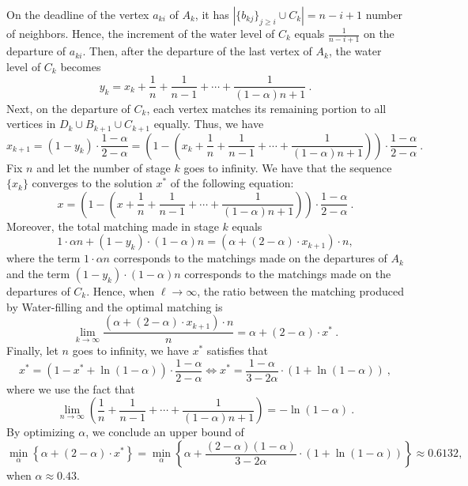 On the deadline of the vertex $a_{ki}$ of $A_k$, it has $|\{b_{kj}\}_{j \ge i} \cup C_k| = n-i+1$ number of neighbors. Hence, the increment of the water level of $C_k$ equals $\frac{1}{n-i+1}$ on the departure of $a_{ki}$. Then, after the departure of the last vertex of $A_k$, the water level of $C_k$ becomes
\[
y_k = x_{k} + \frac{1}{n} + \frac{1}{n-1} + \cdots + \frac{1}{(1-\alpha)n + 1}~. %
\]
Next, on the departure of $C_k$, each vertex matches its remaining portion to all vertices in $D_k \cup B_{k+1} \cup C_{k+1}$ equally. Thus, we have
\[
x_{k+1} = (1 - y_k) \cdot \frac{1-\alpha}{2-\alpha} = \left(1 - \left(x_k + \frac{1}{n} + \frac{1}{n-1} + \cdots + \frac{1}{(1-\alpha)n+1}\right)\right) \cdot \frac{1-\alpha}{2-\alpha}~.
\]
Fix $n$ and let the number of stage $k$ goes to infinity. We have that the sequence $\{x_k\}$ converges to the solution $x^*$ of the following equation:
\[
x = \left(1 - \left(x + \frac{1}{n} + \frac{1}{n-1} + \cdots + \frac{1}{(1-\alpha)n+1}\right)\right) \cdot \frac{1-\alpha}{2-\alpha}~.
\]
Moreover, the total matching made in stage $k$ equals 
\[
1 \cdot \alpha n + (1-y_k) \cdot (1-\alpha) n = \left(\alpha + (2-\alpha)\cdot x_{k+1}\right) \cdot n,
\]
where the term $1 \cdot \alpha n$ corresponds to the matchings made on the departures of $A_k$ and the term $(1-y_k)\cdot(1-\alpha) n$ corresponds to the matchings made on the departures of $C_k$.
Hence, when $\ell \to \infty$, the ratio between the matching produced by Water-filling and the optimal matching is
\[
\lim_{k \to \infty} \frac{\left(\alpha + (2-\alpha)\cdot x_{k+1}\right) \cdot n}{n} = \alpha + (2-\alpha)\cdot x^*~.
\]
Finally, let $n$ goes to infinity, we have $x^*$ satisfies that
\[
x^* = \left( 1-x^*+\ln(1-\alpha) \right) \cdot \frac{1-\alpha}{2-\alpha} \iff x^*= \frac{1-\alpha}{3-2\alpha} \cdot (1+\ln(1-\alpha)) ~,
\]
where we use the fact that 
\[
\lim_{n\to \infty}\left( \frac{1}{n} + \frac{1}{n-1} + \cdots + \frac{1}{(1-\alpha)n+1} \right) = -\ln(1-\alpha)~.
\]
By optimizing $\alpha$, we conclude an upper bound of
\[
\min_{\alpha} \left\{ \alpha+(2-\alpha)\cdot x^* \right\} = \min_{\alpha} \left\{\alpha+\frac{(2-\alpha)(1-\alpha)}{3-2\alpha} \cdot (1+\ln(1-\alpha)) \right\} \approx 0.6132,
\]
when $\alpha \approx 0.43$.

 

